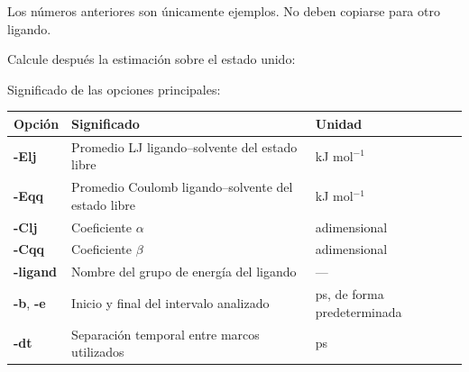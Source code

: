 \documentclass[
  spanish,
  11pt,
  a4paper]{article}
\newenvironment{Shaded}{\begin{snugshade}}{\end{snugshade}}
\newcommand{\AttributeTok}[1]{\textcolor[rgb]{0.13,0.29,0.53}{#1}}
\newcommand{\DataTypeTok}[1]{\textcolor[rgb]{0.13,0.29,0.53}{#1}}
\newcommand{\ExtensionTok}[1]{#1}
\newcommand{\NormalTok}[1]{#1}
\newcommand{\StringTok}[1]{\textcolor[rgb]{0.31,0.60,0.02}{#1}}
\newcommand{\VariableTok}[1]{\textcolor[rgb]{0.00,0.00,0.00}{#1}}
\newcounter{none} %
\begin{document}
Los números anteriores son únicamente ejemplos. No deben copiarse para
otro ligando.

Calcule después la estimación sobre el estado unido:

\begin{Shaded}
\end{Shaded}

Significado de las opciones principales:

{\def\LTcaptype{none} %
\begin{longtable}[]{@{}
  >{\raggedright\arraybackslash}p{}
  >{\raggedright\arraybackslash}p{}
  >{\raggedright\arraybackslash}p{}@{}}
\toprule\noalign{}
\begin{minipage}[b]{\linewidth}\raggedright
Opción
\end{minipage} & \begin{minipage}[b]{\linewidth}\raggedright
Significado
\end{minipage} & \begin{minipage}[b]{\linewidth}\raggedright
Unidad
\end{minipage} \\
\midrule\noalign{}
\endhead
\bottomrule\noalign{}
\endlastfoot
\textbf{-Elj} & Promedio LJ ligando--solvente del estado libre & kJ
mol\(^{-1}\) \\
\textbf{-Eqq} & Promedio Coulomb ligando--solvente del estado libre & kJ
mol\(^{-1}\) \\
\textbf{-Clj} & Coeficiente \(\alpha\) & adimensional \\
\textbf{-Cqq} & Coeficiente \(\beta\) & adimensional \\
\textbf{-ligand} & Nombre del grupo de energía del ligando & --- \\
\textbf{-b}, \textbf{-e} & Inicio y final del intervalo analizado & ps,
de forma predeterminada \\
\textbf{-dt} & Separación temporal entre marcos utilizados & ps \\
\end{longtable}
}
\end{document}
